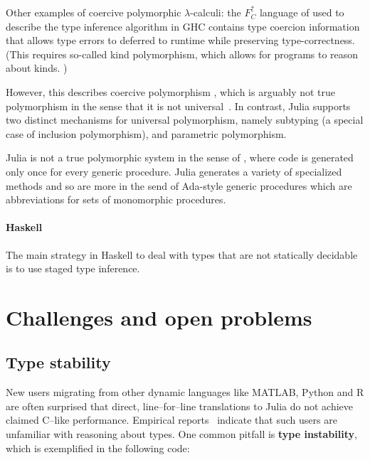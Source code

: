 \documentclass[pldi]{sigplanconf-pldi15}
\begin{document}
Other examples of coercive polymorphic $\lambda$-calculi: the $F^\uparrow_C$
language of \cite{Vytiniotis2012,haskellkindtypes} used to describe the type
inference algorithm in GHC \cite{Weirich2011} contains type coercion
information that allows type errors to deferred to runtime
\cite{Vytiniotis2012} while preserving type-correctness. (This requires
so-called kind polymorphism, which allows for programs to reason about kinds.
\cite{haskellkindtypes})


However, this describes coercive polymorphism \cite{Cardelli1985}, which
is arguably not true polymorphism in the sense that it is not
universal~\cite{Strachey1967,Strachey2000}. In contrast, Julia supports two
distinct mechanisms for universal polymorphism, namely subtyping (a special
case of inclusion polymorphism), and parametric polymorphism.

Julia is not a true polymorphic system in the sense of \cite{Cardelli1985},
where code is generated only once for every generic procedure. Julia generates
a variety of specialized methods and so are more in the send of Ada-style
generic procedures which are abbreviations for sets of monomorphic procedures.


\paragraph{Haskell}

The main strategy in Haskell to deal with types that are not statically
decidable is to use staged type inference.~\cite{Shields1998}




\section{Challenges and open problems}

\subsection{Type stability}
New users migrating from other dynamic languages like MATLAB, Python and R are
often surprised that direct, line--for--line translations to Julia do not
achieve claimed C--like performance. Empirical reports~\cite{julia-users}
indicate that such users are unfamiliar with reasoning about types. One common
pitfall is \textbf{type instability}, which is exemplified in the following
code:
\end{document}
